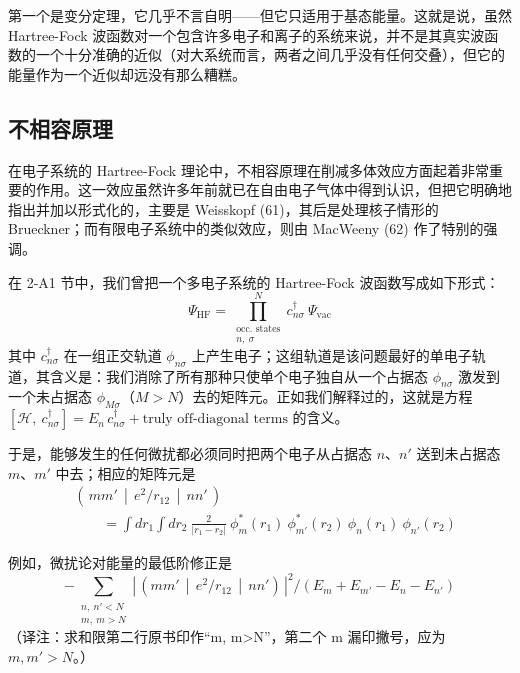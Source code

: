 第一个是变分定理，它几乎不言自明——但它只适用于基态能量。这就是说，虽然 Hartree-Fock 波函数对一个包含许多电子和离子的系统来说，并不是其真实波函数的一个十分准确的近似（对大系统而言，两者之间几乎没有任何交叠），但它的能量作为一个近似却远没有那么糟糕。

\subsection{不相容原理}

在电子系统的 Hartree-Fock 理论中，不相容原理在削减多体效应方面起着非常重要的作用。这一效应虽然许多年前就已在自由电子气体中得到认识，但把它明确地指出并加以形式化的，主要是 Weisskopf (61)，其后是处理核子情形的 Brueckner；而有限电子系统中的类似效应，则由 MacWeeny (62) 作了特别的强调。

在 2-A1 节中，我们曾把一个多电子系统的 Hartree-Fock 波函数写成如下形式：
\begin{equation*}
\Psi_{\mathrm{HF}}=\prod_{\substack{\text{occ. states}\\ n,\ \sigma}}^{N}c^{\dagger}_{n\sigma}\ \Psi_{\mathrm{vac}}
\end{equation*}
其中 $c^{\dagger}_{n\sigma}$ 在一组正交轨道 $\phi_{n\sigma}$ 上产生电子；这组轨道是该问题最好的单电子轨道，其含义是：我们消除了所有那种只使单个电子独自从一个占据态 $\phi_{n\sigma}$ 激发到一个未占据态 $\phi_{M\sigma}$（$M>N$）去的矩阵元。正如我们解释过的，这就是方程
$[\mathcal{H},\ c^{\dagger}_{n\sigma}]=E_{n}\,c^{\dagger}_{n\sigma}+\text{truly off-diagonal terms}$
的含义。

于是，能够发生的任何微扰都必须同时把两个电子从占据态 $n$、$n'$ 送到未占据态 $m$、$m'$ 中去；相应的矩阵元是
\begin{align*}
&\left(\,mm'\,\middle|\,e^{2}/r_{12}\,\middle|\,nn'\,\right)\\
&\qquad=\int dr_{1}\int dr_{2}\ \frac{2}{|r_{1}-r_{2}|}\ \phi^{*}_{m}(r_{1})\ \phi^{*}_{m'}(r_{2})\ \phi_{n}(r_{1})\ \phi_{n'}(r_{2})
\end{align*}

例如，微扰论对能量的最低阶修正是
\begin{equation*}
-\sum_{\substack{n,\ n'<N\\ m,\ m>N}}\left|\,\left(mm'\,\middle|\,e^{2}/r_{12}\,\middle|\,nn'\right)\,\right|^{2}\Big/\left(E_{m}+E_{m'}-E_{n}-E_{n'}\right)
\end{equation*}
（译注：求和限第二行原书印作“m, m>N”，第二个 m 漏印撇号，应为 $m, m'>N$。）

